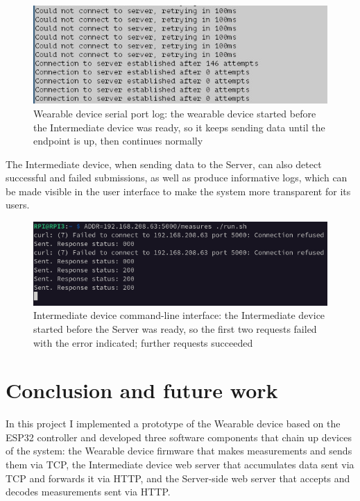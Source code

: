 \documentclass[lettersize,journal]{IEEEtran}
\begin{document}
\begin{figure}
    \centering
    \includegraphics[width=1\linewidth]{Images/ESP: server down then up.jpg}
    \caption{Wearable device serial port log: the wearable device started before the Intermediate device was ready, so it keeps sending data until the endpoint is up, then continues normally}
\end{figure}

The Intermediate device, when sending data to the Server, can also detect successful
and failed submissions, as well as produce informative logs, which can be made visible
in the user interface to make the system more transparent for its users.

\begin{figure}
    \centering
    \includegraphics[width=1\linewidth]{Images/RPI: server down then up.png}
    \caption{Intermediate device command-line interface: the Intermediate device started before the Server was ready, so the first two requests failed with the error indicated; further requests succeeded}
\end{figure}

\section{Conclusion and future work}

In this project I implemented a prototype of the Wearable device based on the ESP32
controller and developed three software components that chain up devices of the system:
the Wearable device firmware that makes measurements and sends them via TCP,
the Intermediate device web server that accumulates data sent via TCP and forwards it via HTTP,
and the Server-side web server that accepts and decodes measurements sent via HTTP.
\\
\end{document}
